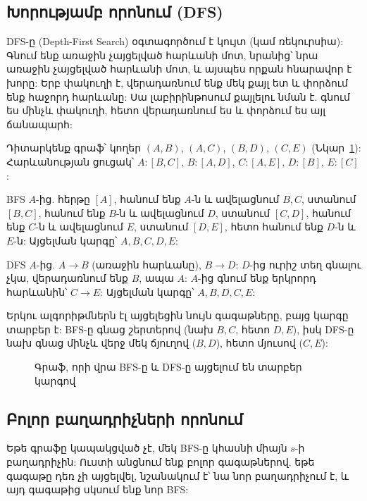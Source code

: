 \subsection{Խորությամբ որոնում (DFS)}

DFS-ը (Depth-First Search) օգտագործում է կույտ (կամ ռեկուրսիա): Գնում ենք առաջին չայցելված հարևանի մոտ, նրանից՝ նրա առաջին չայցելված հարևանի մոտ, և այսպես որքան հնարավոր է խորը: Երբ փակուղի է, վերադառնում ենք մեկ քայլ ետ և փորձում ենք հաջորդ հարևանը: Սա լաբիրինթոսում քայլելու նման է. գնում ես մինչև փակուղի, հետո վերադառնում ես և փորձում ես այլ ճանապարհ:

\begin{example}\label{ex:cmp}
Դիտարկենք գրաֆ՝ կողեր $(A,B)$, $(A,C)$, $(B,D)$, $(C,E)$ (Նկար~\ref{fig:cmp}): Հարևանության ցուցակ՝ $A:[B,C]$, $B:[A,D]$, $C:[A,E]$, $D:[B]$, $E:[C]$:

BFS $A$-ից. հերթը $[A]$, հանում ենք $A$-ն և ավելացնում $B,C$, ստանում $[B,C]$, հանում ենք $B$-ն և ավելացնում $D$, ստանում $[C,D]$, հանում ենք $C$-ն և ավելացնում $E$, ստանում $[D,E]$, հետո հանում ենք $D$-ն և $E$-ն: Այցելման կարգը՝ $A,B,C,D,E$:

DFS $A$-ից. $A\to B$ (առաջին հարևանը), $B\to D$: $D$-ից ուրիշ տեղ գնալու չկա, վերադառնում ենք $B$, ապա $A$: $A$-ից գնում ենք երկրորդ հարևանին՝ $C\to E$: Այցելման կարգը՝ $A,B,D,C,E$:

Երկու ալգորիթմներն էլ այցելեցին նույն գագաթները, բայց կարգը տարբեր է: BFS-ը գնաց շերտերով (նախ $B,C$, հետո $D,E$), իսկ DFS-ը նախ գնաց մինչև վերջ մեկ ճյուղով ($B,D$), հետո մյուսով ($C,E$):
\end{example}

\begin{figure}[h]
\centering
{}
\caption{Գրաֆ, որի վրա BFS-ը և DFS-ը այցելում են տարբեր կարգով}\label{fig:cmp}
\end{figure}

\subsection{Բոլոր բաղադրիչների որոնում}

Եթե գրաֆը կապակցված չէ, մեկ BFS-ը կհասնի միայն $s$-ի բաղադրիչին: Ուստի անցնում ենք բոլոր գագաթներով. եթե գագաթը դեռ չի այցելվել, նշանակում է՝ նա նոր բաղադրիչում է, և այդ գագաթից սկսում ենք նոր BFS:

